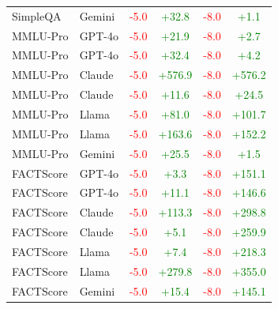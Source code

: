 \begin{table}[htbp]
\begin{tabular}{ll|cc|cc}
SimpleQA & Gemini & \textcolor{red}{-5.0} & \textcolor{green}{+32.8} & \textcolor{red}{-8.0} & \textcolor{green}{+1.1} \\
MMLU-Pro & GPT-4o & \textcolor{red}{-5.0} & \textcolor{green}{+21.9} & \textcolor{red}{-8.0} & \textcolor{green}{+2.7} \\
MMLU-Pro & GPT-4o & \textcolor{red}{-5.0} & \textcolor{green}{+32.4} & \textcolor{red}{-8.0} & \textcolor{green}{+4.2} \\
MMLU-Pro & Claude & \textcolor{red}{-5.0} & \textcolor{green}{+576.9} & \textcolor{red}{-8.0} & \textcolor{green}{+576.2} \\
MMLU-Pro & Claude & \textcolor{red}{-5.0} & \textcolor{green}{+11.6} & \textcolor{red}{-8.0} & \textcolor{green}{+24.5} \\
MMLU-Pro & Llama & \textcolor{red}{-5.0} & \textcolor{green}{+81.0} & \textcolor{red}{-8.0} & \textcolor{green}{+101.7} \\
MMLU-Pro & Llama & \textcolor{red}{-5.0} & \textcolor{green}{+163.6} & \textcolor{red}{-8.0} & \textcolor{green}{+152.2} \\
MMLU-Pro & Gemini & \textcolor{red}{-5.0} & \textcolor{green}{+25.5} & \textcolor{red}{-8.0} & \textcolor{green}{+1.5} \\
FACTScore & GPT-4o & \textcolor{red}{-5.0} & \textcolor{green}{+3.3} & \textcolor{red}{-8.0} & \textcolor{green}{+151.1} \\
FACTScore & GPT-4o & \textcolor{red}{-5.0} & \textcolor{green}{+11.1} & \textcolor{red}{-8.0} & \textcolor{green}{+146.6} \\
FACTScore & Claude & \textcolor{red}{-5.0} & \textcolor{green}{+113.3} & \textcolor{red}{-8.0} & \textcolor{green}{+298.8} \\
FACTScore & Claude & \textcolor{red}{-5.0} & \textcolor{green}{+5.1} & \textcolor{red}{-8.0} & \textcolor{green}{+259.9} \\
FACTScore & Llama & \textcolor{red}{-5.0} & \textcolor{green}{+7.4} & \textcolor{red}{-8.0} & \textcolor{green}{+218.3} \\
FACTScore & Llama & \textcolor{red}{-5.0} & \textcolor{green}{+279.8} & \textcolor{red}{-8.0} & \textcolor{green}{+355.0} \\
FACTScore & Gemini & \textcolor{red}{-5.0} & \textcolor{green}{+15.4} & \textcolor{red}{-8.0} & \textcolor{green}{+145.1} \\
\bottomrule
\end{tabular}
\end{table}

